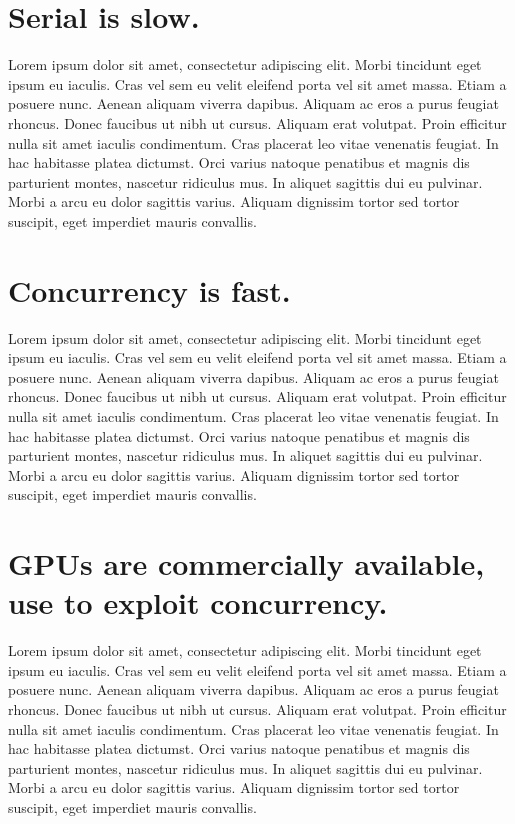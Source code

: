 \documentclass[openany]{book}
\begin{document}
\section{Serial is slow.}
Lorem ipsum dolor sit amet, consectetur adipiscing elit. Morbi tincidunt eget 
ipsum eu iaculis. Cras vel sem eu velit eleifend porta vel sit amet massa. Etiam 
a posuere nunc. Aenean aliquam viverra dapibus. Aliquam ac eros a purus feugiat 
rhoncus. Donec faucibus ut nibh ut cursus. Aliquam erat volutpat. Proin efficitur 
nulla sit amet iaculis condimentum. Cras placerat leo vitae venenatis feugiat. In 
hac habitasse platea dictumst. Orci varius natoque penatibus et magnis dis 
parturient montes, nascetur ridiculus mus. In aliquet sagittis dui eu pulvinar. 
Morbi a arcu eu dolor sagittis varius. Aliquam dignissim tortor sed tortor 
suscipit, eget imperdiet mauris convallis.~\cite[p.~00]{SourceNeeded}



\section{Concurrency is fast.}
Lorem ipsum dolor sit amet, consectetur adipiscing elit. Morbi tincidunt eget 
ipsum eu iaculis. Cras vel sem eu velit eleifend porta vel sit amet massa. Etiam 
a posuere nunc. Aenean aliquam viverra dapibus. Aliquam ac eros a purus feugiat 
rhoncus. Donec faucibus ut nibh ut cursus. Aliquam erat volutpat. Proin efficitur 
nulla sit amet iaculis condimentum. Cras placerat leo vitae venenatis feugiat. In 
hac habitasse platea dictumst. Orci varius natoque penatibus et magnis dis 
parturient montes, nascetur ridiculus mus. In aliquet sagittis dui eu pulvinar. 
Morbi a arcu eu dolor sagittis varius. Aliquam dignissim tortor sed tortor 
suscipit, eget imperdiet mauris convallis.~\cite[p.~00]{SourceNeeded}



\section{GPUs are commercially available, use to exploit concurrency.}
Lorem ipsum dolor sit amet, consectetur adipiscing elit. Morbi tincidunt eget 
ipsum eu iaculis. Cras vel sem eu velit eleifend porta vel sit amet massa. Etiam 
a posuere nunc. Aenean aliquam viverra dapibus. Aliquam ac eros a purus feugiat 
rhoncus. Donec faucibus ut nibh ut cursus. Aliquam erat volutpat. Proin efficitur 
nulla sit amet iaculis condimentum. Cras placerat leo vitae venenatis feugiat. In 
hac habitasse platea dictumst. Orci varius natoque penatibus et magnis dis 
parturient montes, nascetur ridiculus mus. In aliquet sagittis dui eu pulvinar. 
Morbi a arcu eu dolor sagittis varius. Aliquam dignissim tortor sed tortor 
suscipit, eget imperdiet mauris convallis.~\cite[p.~00]{SourceNeeded}
\end{document}
